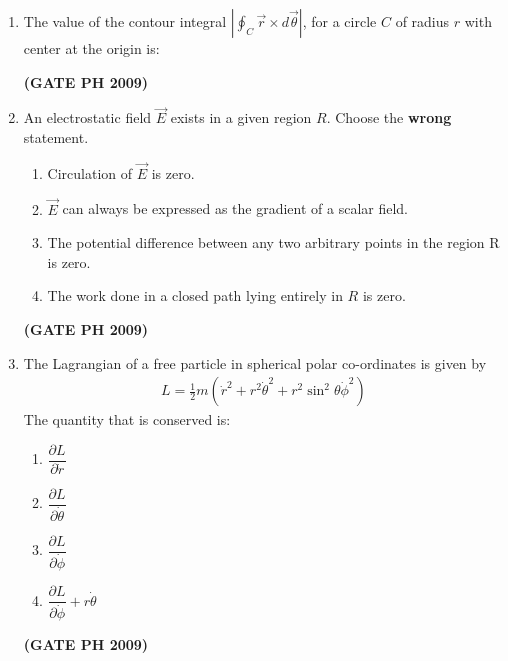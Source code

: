 \documentclass[14pt, a4paper]{extarticle}
\renewcommand{\vec}[1]{\overrightarrow{#1}}
\begin{document}
\begin{enumerate}[label=\textbf{Q. \arabic*}]

\item The value of the contour integral
    $ \left| \oint_C \vec{r} \times d\vec{\theta} \right| $,
    for a circle $C$ of radius $r$ with center at the origin is:
    \begin{enumerate}
    \end{enumerate}
    \hfill \textbf{(GATE PH 2009)}

\item An electrostatic field $\vec{E}$ exists in a given region $R$. Choose the \textbf{wrong} statement.
   
    \begin{enumerate}
        \item Circulation of $\vec{E}$ is zero.
        \item $\vec{E}$ can always be expressed as the gradient of a scalar field.
        \item The potential difference between any two arbitrary points in the region R is zero.
        \item The work done in a closed path lying entirely in $R$ is zero.   
    \end{enumerate}
    \hfill \textbf{(GATE PH 2009)}


\item The Lagrangian of a free particle in spherical polar co-ordinates is given by
    \begin{align*}
    L = \frac{1}{2}m(\dot{r}^2 + r^2\dot{\theta}^2 + r^2\sin^2\theta\dot{\phi}^2)
    \end{align*}
    The quantity that is conserved is:
    \begin{multicols}{2}
    \begin{enumerate}
        \item $\dfrac{\partial L}{\partial \dot{r}}$
        \item $\dfrac{\partial L}{\partial \dot{\theta}}$
        \item $\dfrac{\partial L}{\partial \dot{\phi}}$
        \item $\dfrac{\partial L}{\partial \dot{\phi}} + r \dot{\theta}$
    \end{enumerate}
    \end{multicols}
    \hfill \textbf{(GATE PH 2009)}


\end{enumerate}
\end{document}

